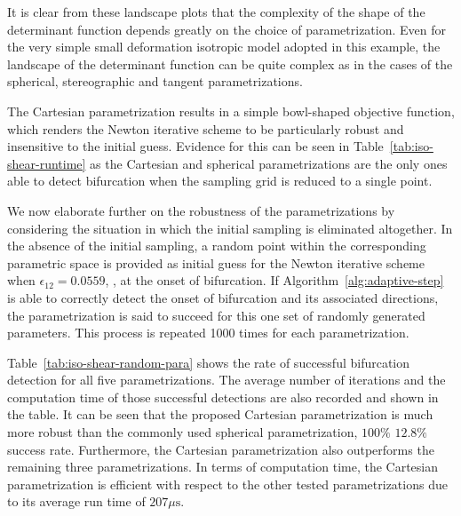 \documentclass[12pt]{article}
\numberwithin{equation}{section}
\begin{document}
It is clear from these landscape plots that the complexity of the
shape of the determinant function depends greatly on the choice of
parametrization. Even for the very simple small deformation isotropic
model adopted in this example, the landscape of the determinant
function can be quite complex as in the cases of the spherical,
stereographic and tangent parametrizations.

The Cartesian parametrization results in a simple bowl-shaped
objective function, which renders the Newton iterative scheme to be
particularly robust and insensitive to the initial guess. Evidence for
this can be seen in Table~\ref{tab:iso-shear-runtime} as the Cartesian
and spherical parametrizations are the only ones able to detect
bifurcation when the sampling grid is reduced to a single point.

We now elaborate further on the robustness of the parametrizations by
considering the situation in which the initial sampling is eliminated
altogether. In the absence of the initial sampling, a random point
within the corresponding parametric space is provided as initial guess
for the Newton iterative scheme when $\epsilon_{12}=0.0559$, \ie, at
the onset of bifurcation. If Algorithm~\ref{alg:adaptive-step} is able
to correctly detect the onset of bifurcation and its associated
directions, the parametrization is said to succeed for this one set of
randomly generated parameters. This process is repeated 1000 times for
each parametrization.

Table~\ref{tab:iso-shear-random-para} shows the rate of successful
bifurcation detection for all five parametrizations. The average
number of iterations and the computation time of those successful
detections are also recorded and shown in the table. It can be seen
that the proposed Cartesian parametrization is much more robust than
the commonly used spherical parametrization, \cf $100\%$ \vs $12.8\%$
success rate. Furthermore, the Cartesian parametrization also
outperforms the remaining three parametrizations. In terms of
computation time, the Cartesian parametrization is efficient with
respect to the other tested parametrizations due to its average run
time of $207\mu\text{s}$.
\end{document}
